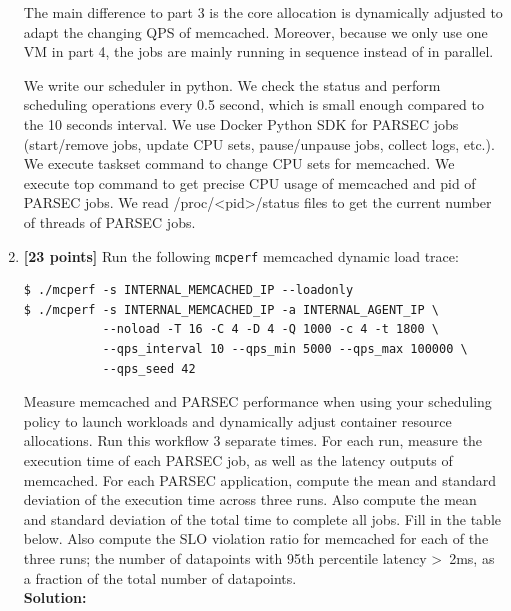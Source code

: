 \documentclass[11pt]{article}
\begin{document}
\begin{enumerate}
The main difference to part 3 is the core allocation is dynamically adjusted to adapt the changing QPS of memcached. Moreover, because we only use one VM in part 4, the jobs are mainly running in sequence instead of in parallel.

We write our scheduler in python. We check the status and perform scheduling operations every 0.5 second, which is small enough compared to the 10 seconds interval. We use Docker Python SDK for PARSEC jobs (start/remove jobs, update CPU sets, pause/unpause jobs, collect logs, etc.). We execute taskset command to change CPU sets for memcached. We execute top command to get precise CPU usage of memcached and pid of PARSEC jobs. We read /proc/\textless pid\textgreater/status files to get the current number of threads of PARSEC jobs.

    \item \textbf{[23 points]} Run the following \texttt{mcperf} memcached dynamic load trace: 
    
            \begin{Verbatim}[fontsize=\small]
$ ./mcperf -s INTERNAL_MEMCACHED_IP --loadonly 
$ ./mcperf -s INTERNAL_MEMCACHED_IP -a INTERNAL_AGENT_IP \ 
           --noload -T 16 -C 4 -D 4 -Q 1000 -c 4 -t 1800 \ 
           --qps_interval 10 --qps_min 5000 --qps_max 100000 \ 
           --qps_seed 42
\end{Verbatim}
    
    
    Measure memcached and PARSEC performance when using your scheduling policy to launch workloads and dynamically adjust container resource allocations. Run this workflow 3 separate times. For each run, measure the execution time of each PARSEC job, as well as the latency outputs of memcached. For each PARSEC application, compute the mean and standard deviation of the execution time across three runs. Also compute the mean and standard deviation of the total time to complete all jobs. Fill in the table below.  Also compute the SLO violation ratio for memcached for each of the three runs; the number of datapoints with 95th percentile latency \textgreater \ 2ms, as a fraction of the total number of datapoints.  \\
    
    \textbf{Solution:}
    

\end{enumerate}
\end{document}
